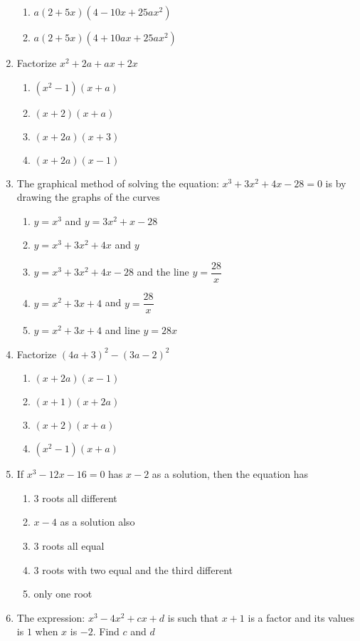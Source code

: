\begin{multicols}{2}
\begin{enumerate}[label={\arabic*.}]
\begin{enumerate}[label={\Alph*.}]
	\item \(a(2+5x)(4-10x+25a{x}^{2})\)
	\item \(a(2+5x)(4+10ax+25a{x}^{2})\)
	\end{enumerate}
\item Factorize \({x}^{2}+2a+ax+2x\)
	\begin{enumerate}[label={\Alph*.}]
	\item \(({x}^{2}-1)(x+a)\)
	\item \((x+2)(x+a)\)
	\item \((x+2a)(x+3)\)
	\item \((x+2a)(x-1)\)
	\end{enumerate}
\item The graphical method of solving the equation: \({x}^{3}+3{x}^{2}+4x-28 = 0\) is by drawing the graphs of the curves
	\begin{enumerate}[label={\Alph*.}]
	\item \(y = {x}^{3}\) and \(y=3{x}^{2} + x -28\)
	\item \(y = {x}^{3}+3{x}^{2}+4x\) and \(y\)
	\item \(y = {x}^{3}+3{x}^{2}+4x-28\) and the line \(y=\dfrac{28}{x}\)
	\item \(y = {x}^{2}+3x+4\) and \(y = \dfrac{28}{x}\)
	\item \(y = {x}^{2}+3x+4\) and line \(y = 28x\)
	\end{enumerate}
\item Factorize \((4a+3)^2-(3a-2)^2\)
	\begin{enumerate}[label={\Alph*.}]
	\item \((x+2a)(x-1)\)
	\item \((x+1)(x+2a)\)
	\item \((x+2)(x+a)\)
	\item \(({x}^{2}-1)(x+a)\)
	\end{enumerate}
\item If \({x}^{3} - 12x - 16 = 0\) has \(x-2\) as a solution, then the equation has
	\begin{enumerate}[label={\Alph*.}]
	\item 3 roots all different
	\item \(x-4\) as a solution also
	\item \(3\) roots all equal
	\item \(3\) roots with two equal and the third different
	\item only one root
	\end{enumerate}
\item The expression: \({x}^{3}-4{x}^{2}+cx+d\) is such that \(x+1\) is a factor and its values is \(1\) when \(x\) is \(-2\). Find \(c\) and \(d\)

\end{enumerate}
\end{multicols}
